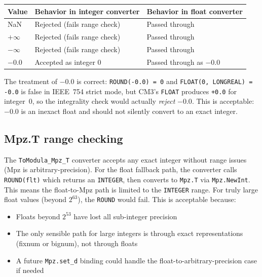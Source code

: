 \documentclass[11pt]{article}
\begin{document}
\begin{center}
\begin{tabular}{lll}
\toprule
\textbf{Value} & \textbf{Behavior in integer converter} & \textbf{Behavior in float converter} \\
\midrule
NaN            & Rejected (fails range check) & Passed through \\
$+\infty$      & Rejected (fails range check) & Passed through \\
$-\infty$      & Rejected (fails range check) & Passed through \\
$-0.0$         & Accepted as integer 0        & Passed through as $-0.0$ \\
\bottomrule
\end{tabular}
\end{center}

The treatment of $-0.0$ is correct: \texttt{ROUND(-0.0) = 0} and
\texttt{FLOAT(0, LONGREAL) = -0.0} is false in IEEE~754 strict mode,
but CM3's \texttt{FLOAT} produces \texttt{+0.0} for integer~0, so
the integrality check would actually \emph{reject} $-0.0$.  This is
acceptable: $-0.0$ is an inexact float and should not silently convert
to an exact integer.

\subsection{Mpz.T range checking}

The \texttt{ToModula\_Mpz\_T} converter accepts any exact integer
without range issues (Mpz is arbitrary-precision).  For the float
fallback path, the converter calls \texttt{ROUND(flt)} which returns
an \texttt{INTEGER}, then converts to \texttt{Mpz.T} via
\texttt{Mpz.NewInt}.  This means the float-to-Mpz path is limited
to the \texttt{INTEGER} range.  For truly large float values (beyond
$2^{63}$), the \texttt{ROUND} would fail.  This is acceptable because:
\begin{itemize}
\item Floats beyond $2^{53}$ have lost all sub-integer precision
\item The only sensible path for large integers is through exact
  representations (fixnum or bignum), not through floats
\item A future \texttt{Mpz.set\_d} binding could handle the
  float-to-arbitrary-precision case if needed
\end{itemize}

\end{document}
